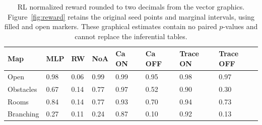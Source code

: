 \begin{table}[htbp]\centering\footnotesize
\setlength{\tabcolsep}{3.5pt}
\caption{RL normalized reward rounded to two decimals from the vector graphics. Figure~\ref{fig:reward} retains the original seed points and marginal intervals, using filled and open markers. These graphical estimates contain no paired $p$-values and cannot replace the inferential tables.}\label{tab:reward_means}
\begin{tabular}{@{}llllllll@{}}\toprule
Map & MLP & RW & NoA & Ca ON & Ca OFF & Trace ON & Trace OFF\\\midrule
Open & 0.98 & 0.06 & 0.99 & 0.99 & 0.95 & 0.98 & 0.97\\
Obstacles & 0.67 & 0.14 & 0.77 & 0.97 & 0.52 & 0.90 & 0.30\\
Rooms & 0.84 & 0.14 & 0.77 & 0.93 & 0.70 & 0.94 & 0.73\\
Branching & 0.27 & 0.11 & 0.24 & 0.87 & 0.10 & 0.92 & 0.13\\
\bottomrule\end{tabular}
\end{table}
